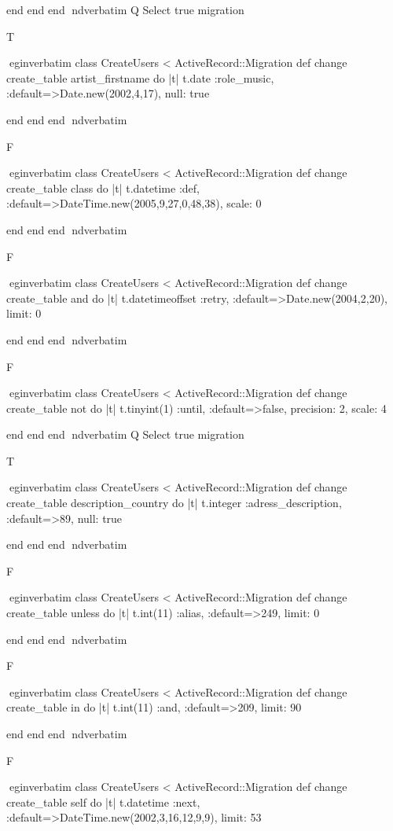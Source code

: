     end 
  end 
end
nd{verbatim}
Q
 Select true migration

T

egin{verbatim}
 class CreateUsers < ActiveRecord::Migration 
  def change 
    create_table artist_firstname do |t| 
      t.date :role_music, :default=>Date.new(2002,4,17), null: true
    
    end 
  end 
end
nd{verbatim}

F

egin{verbatim}
 class CreateUsers < ActiveRecord::Migration 
  def change 
    create_table class do |t| 
      t.datetime :def, :default=>DateTime.new(2005,9,27,0,48,38), scale: 0
    
    end 
  end 
end
nd{verbatim}

F

egin{verbatim}
 class CreateUsers < ActiveRecord::Migration 
  def change 
    create_table and do |t| 
      t.datetimeoffset :retry, :default=>Date.new(2004,2,20), limit: 0
    
    end 
  end 
end
nd{verbatim}

F

egin{verbatim}
 class CreateUsers < ActiveRecord::Migration 
  def change 
    create_table not do |t| 
      t.tinyint(1) :until, :default=>false, precision: 2, scale: 4
    
    end 
  end 
end
nd{verbatim}
Q
 Select true migration

T

egin{verbatim}
 class CreateUsers < ActiveRecord::Migration 
  def change 
    create_table description_country do |t| 
      t.integer :adress_description, :default=>89, null: true
    
    end 
  end 
end
nd{verbatim}

F

egin{verbatim}
 class CreateUsers < ActiveRecord::Migration 
  def change 
    create_table unless do |t| 
      t.int(11) :alias, :default=>249, limit: 0
    
    end 
  end 
end
nd{verbatim}

F

egin{verbatim}
 class CreateUsers < ActiveRecord::Migration 
  def change 
    create_table in do |t| 
      t.int(11) :and, :default=>209, limit: 90
    
    end 
  end 
end
nd{verbatim}

F

egin{verbatim}
 class CreateUsers < ActiveRecord::Migration 
  def change 
    create_table self do |t| 
      t.datetime :next, :default=>DateTime.new(2002,3,16,12,9,9), limit: 53
    

